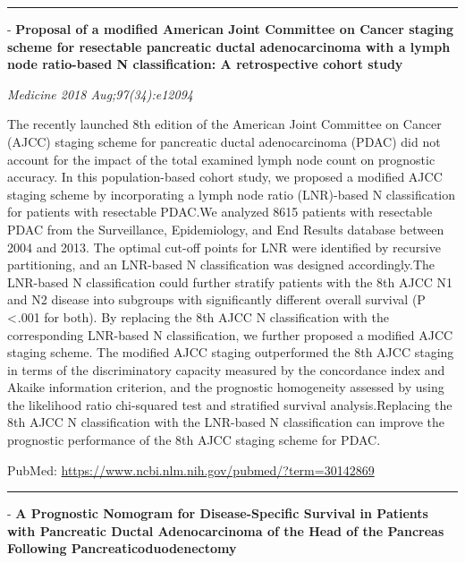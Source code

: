 \documentclass[]{article}
\begin{document}
\begin{center}\rule{0.5\linewidth}{\linethickness}\end{center}

 - \textbf{Proposal of a modified American Joint Committee on Cancer
staging scheme for resectable pancreatic ductal adenocarcinoma with a
lymph node ratio-based N classification: A retrospective cohort study}

\emph{Medicine 2018 Aug;97(34):e12094}

The recently launched 8th edition of the American Joint Committee on
Cancer (AJCC) staging scheme for pancreatic ductal adenocarcinoma (PDAC)
did not account for the impact of the total examined lymph node count on
prognostic accuracy. In this population-based cohort study, we proposed
a modified AJCC staging scheme by incorporating a lymph node ratio
(LNR)-based N classification for patients with resectable PDAC.We
analyzed 8615 patients with resectable PDAC from the Surveillance,
Epidemiology, and End Results database between 2004 and 2013. The
optimal cut-off points for LNR were identified by recursive
partitioning, and an LNR-based N classification was designed
accordingly.The LNR-based N classification could further stratify
patients with the 8th AJCC N1 and N2 disease into subgroups with
significantly different overall survival (P \textless{} .001 for both).
By replacing the 8th AJCC N classification with the corresponding
LNR-based N classification, we further proposed a modified AJCC staging
scheme. The modified AJCC staging outperformed the 8th AJCC staging in
terms of the discriminatory capacity measured by the concordance index
and Akaike information criterion, and the prognostic homogeneity
assessed by using the likelihood ratio chi-squared test and stratified
survival analysis.Replacing the 8th AJCC N classification with the
LNR-based N classification can improve the prognostic performance of the
8th AJCC staging scheme for PDAC.

PubMed: \url{https://www.ncbi.nlm.nih.gov/pubmed/?term=30142869}

{}

{}

\begin{center}\rule{0.5\linewidth}{\linethickness}\end{center}

 - \textbf{A Prognostic Nomogram for Disease-Specific Survival in
Patients with Pancreatic Ductal Adenocarcinoma of the Head of the
Pancreas Following Pancreaticoduodenectomy}
\end{document}
